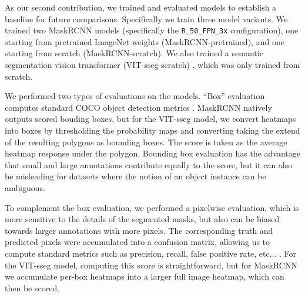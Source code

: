 \documentclass[10pt,twocolumn,letterpaper]{article}
\begin{document}
As our second contribution, we trained and evaluated models to establish a baseline for future comparisons.
Specifically we train three model variants.
We trained two MaskRCNN \cite{he2017mask} models (specifically the \texttt{R\_50\_FPN\_3x} configuration),
  one starting from pretrained ImageNet weights (MaskRCNN-pretrained), and one starting from scratch
  (MaskRCNN-scratch).
We also trained a semantic segmentation vision transformer (VIT-sseg-scratch)
  \cite{Greenwell_2024_WACV,crall_geowatch_2024}, which was only trained from scratch.



We performed two types of evaluations on the models.
``Box'' evaluation computes standard COCO object detection metrics \cite{lin_microsoft_2014}.
MaskRCNN natively outputs scored bouding boxes, but for the VIT-sseg model, we convert heatmaps into boxes
  by thresholding the probability maps and converting taking the extend of the resulting polygons as bounding
  boxes.
The score is taken as the average heatmap response under the polygon.
Bounding box evaluation has the advantage that small and large annotations contribute equally to the score,
  but it can also be misleading for datasets where the notion of an object instance can be ambiguous.

To complement the box evaluation, we performed a pixelwise evaluation, which is more sensitive to the
  details of the segmented masks, but also can be biased towards larger annotations with more pixels.
The corresponding truth and predicted pixels were accumulated into a confusion matrix, allowing us to
  compute standard metrics such as precision, recall, false positive rate, etc... \cite{powers_evaluation_2011}.
For the VIT-sseg model, computing this score is straightforward, but for MaskRCNN we accumulate per-box
  heatmaps into a larger full image heatmap, which can then be scored.
\end{document}
